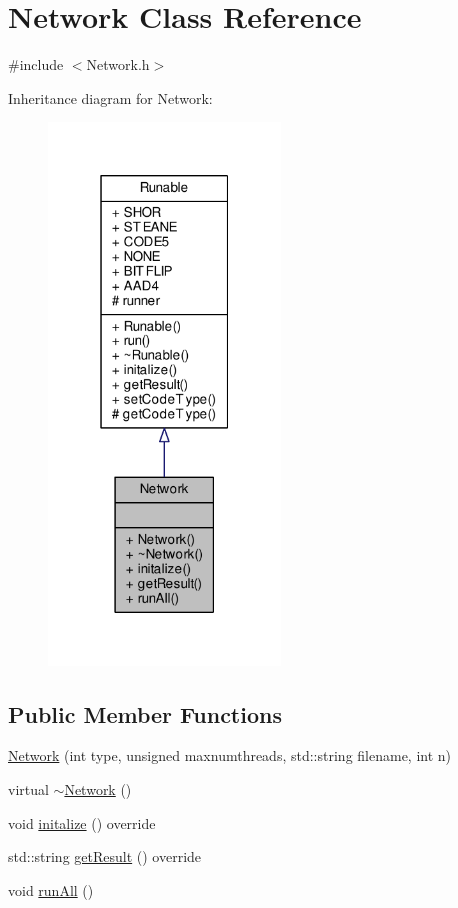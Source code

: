 \hypertarget{class_network}{}\section{Network Class Reference}
\label{class_network}


{\ttfamily \#include $<$Network.\+h$>$}



Inheritance diagram for Network\+:\nopagebreak
\begin{figure}[H]
\begin{center}
\leavevmode
\includegraphics[width=175pt]{class_network__inherit__graph}
\end{center}
\end{figure}
\subsection*{Public Member Functions}
\begin{DoxyCompactItemize}
\item 
\hyperlink{class_network_ad01dfb3d14e9413aeca09b1214de2277}{Network} (int type, unsigned maxnumthreads, std\+::string filename, int n)
\item 
virtual \hyperlink{class_network_a7a4e19cdb4bf0c7ecf82baa643831492}{$\sim$\+Network} ()
\item 
void \hyperlink{class_network_aac12b9028bdef1c44984b1c8e111e69d}{initalize} () override
\item 
std\+::string \hyperlink{class_network_a8bd2e1e2117b07661a149b7e6debb99d}{get\+Result} () override
\item 
void \hyperlink{class_network_a10a99f08c6d2f7f019c83b0899a0c56c}{run\+All} ()
\end{DoxyCompactItemize}
